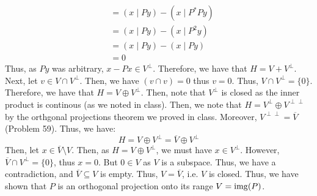 \documentclass[12pt]{article}
\begin{document}
\begin{solution}
\begin{align*}
        &= (x \mid Py) - (x \mid P^*Py) \\
        &= (x \mid Py) - (x \mid P^2y) \\
        &= (x \mid Py) - (x \mid Py) \\
        &= 0
    \end{align*}
    Thus, as $Py$ was arbitrary, $x - Px \in V^\perp$. Therefore, we have that $H = V + V^\perp$. Next, let $v \in V \cap V^\perp$. Then, we have $(v \cap v) = 0$ thus $v = 0$. Thus, $V \cap V^\perp = \{0\}$. Therefore, we have that $H = V \oplus V^\perp$. \bbni
    Then, note that $V^\perp$ is closed as the inner product is continous (as we noted in class). Then, we note that $H = V^\perp \oplus V^{\perp\perp}$ by the orthgonal projections theorem we proved in class. Moreover, $V^{\perp\perp} = \overline{V}$ (Problem 59). Thus, we have:
    \[ H = V \oplus V^\perp = \overline{V} \oplus V^\perp \]
    Then, let $x \in \overline{V}\setminus V$. Then, as $H = V \oplus V^\perp$, we must have $x \in V^\perp$. However, $\overline{V} \cap V^\perp = \{0\}$, thus $x = 0$. But $0 \in V$ as $V$ is a subspace. Thus, we have a contradiction, and $\overline{V} \subseteq V$ is empty. Thus, $V = \overline{V}$, i.e. $V$ is closed. \bbni
    Thus, we have shown that $P$ is an orthogonal projection onto its range $V = \operatorname{img}(P)$. \bbni
\end{solution}
\newpage
\end{document}

